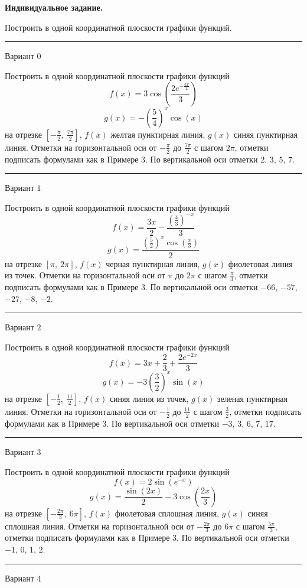 \documentclass[11pt]{report}
\begin{document}
\pagestyle{empty}
{\bf Индивидуальное задание.}

Построить в одной координатной плоскости графики функций.

\begin{center}
\noindent\rule{8cm}{0.4pt}
\end{center}
Вариант $0$


Построить в одной координатной плоскости графики функций $$f(x) = 3 \cos{\left(\frac{2 e^{- \frac{3 x}{2}}}{3} \right)}$$ $$g(x) = - \left(\frac{5}{4}\right)^{x} \cos{\left(x \right)}$$ на отрезке $\left[- \frac{\pi}{2}, \  \frac{7 \pi}{2}\right]$, $f(x)$ желтая пунктирная линия, $g(x)$ синяя пунктирная линия. Отметки на горизонтальной оси от $- \frac{\pi}{2}$ до $\frac{7 \pi}{2}$ с шагом $2 \pi$, отметки подписать формулами как в Примере 3. По вертикальной оси отметки $2$, $3$, $5$, $7$.
\begin{center}
\noindent\rule{8cm}{0.4pt}
\end{center}
Вариант $1$


Построить в одной координатной плоскости графики функций $$f(x) = \frac{3 x}{2} - \frac{\left(\frac{4}{3}\right)^{- x}}{3}$$ $$g(x) = \frac{\left(\frac{5}{2}\right)^{x} \cos{\left(\frac{x}{3} \right)}}{2}$$ на отрезке $\left[\pi, \  2 \pi\right]$, $f(x)$ черная пунктирная линия, $g(x)$ фиолетовая линия из точек. Отметки на горизонтальной оси от $\pi$ до $2 \pi$ с шагом $\frac{\pi}{3}$, отметки подписать формулами как в Примере 3. По вертикальной оси отметки $-66$, $-57$, $-27$, $-8$, $-2$.
\begin{center}
\noindent\rule{8cm}{0.4pt}
\end{center}
Вариант $2$


Построить в одной координатной плоскости графики функций $$f(x) = 3 x + \frac{2}{3} + \frac{2 e^{- 2 x}}{3}$$ $$g(x) = - 3 \left(\frac{3}{2}\right)^{x} \sin{\left(x \right)}$$ на отрезке $\left[- \frac{1}{2}, \  \frac{11}{2}\right]$, $f(x)$ синяя линия из точек, $g(x)$ зеленая пунктирная линия. Отметки на горизонтальной оси от $- \frac{1}{2}$ до $\frac{11}{2}$ с шагом $\frac{3}{2}$, отметки подписать формулами как в Примере 3. По вертикальной оси отметки $-3$, $3$, $6$, $7$, $17$.
\begin{center}
\noindent\rule{8cm}{0.4pt}
\end{center}
Вариант $3$


Построить в одной координатной плоскости графики функций $$f(x) = 2 \sin{\left(e^{- x} \right)}$$ $$g(x) = \frac{\sin{\left(2 x \right)}}{2} - 3 \cos{\left(\frac{2 x}{3} \right)}$$ на отрезке $\left[- \frac{2 \pi}{3}, \  6 \pi\right]$, $f(x)$ фиолетовая сплошная линия, $g(x)$ синяя сплошная линия. Отметки на горизонтальной оси от $- \frac{2 \pi}{3}$ до $6 \pi$ с шагом $\frac{5 \pi}{3}$, отметки подписать формулами как в Примере 3. По вертикальной оси отметки $-1$, $0$, $1$, $2$.
\begin{center}
\noindent\rule{8cm}{0.4pt}
\end{center}
Вариант $4$
\end{document}
